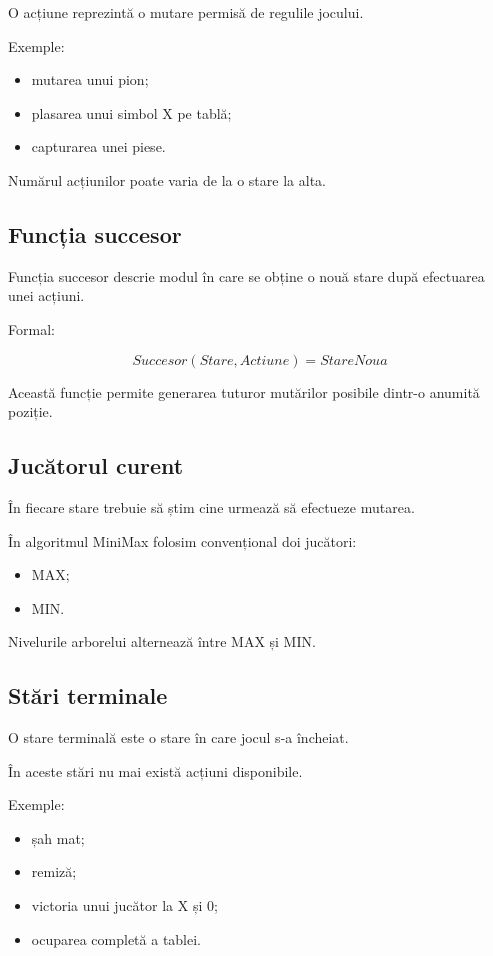 \documentclass[12pt,a4paper]{article}
\begin{document}
O acțiune reprezintă o mutare permisă de regulile jocului.

Exemple:

\begin{itemize}
\item mutarea unui pion;
\item plasarea unui simbol X pe tablă;
\item capturarea unei piese.
\end{itemize}

Numărul acțiunilor poate varia de la o stare la alta.

\subsection{Funcția succesor}

Funcția succesor descrie modul în care se obține o nouă stare după efectuarea unei acțiuni.

Formal:

\[
Succesor(Stare, Actiune)
=
StareNoua
\]

Această funcție permite generarea tuturor mutărilor posibile dintr-o anumită poziție.

\subsection{Jucătorul curent}

În fiecare stare trebuie să știm cine urmează să efectueze mutarea.

În algoritmul MiniMax folosim convențional doi jucători:

\begin{itemize}
\item MAX;
\item MIN.
\end{itemize}

Nivelurile arborelui alternează între MAX și MIN.

\subsection{Stări terminale}

O stare terminală este o stare în care jocul s-a încheiat.

În aceste stări nu mai există acțiuni disponibile.

Exemple:

\begin{itemize}
\item șah mat;
\item remiză;
\item victoria unui jucător la X și 0;
\item ocuparea completă a tablei.
\end{itemize}
\end{document}
